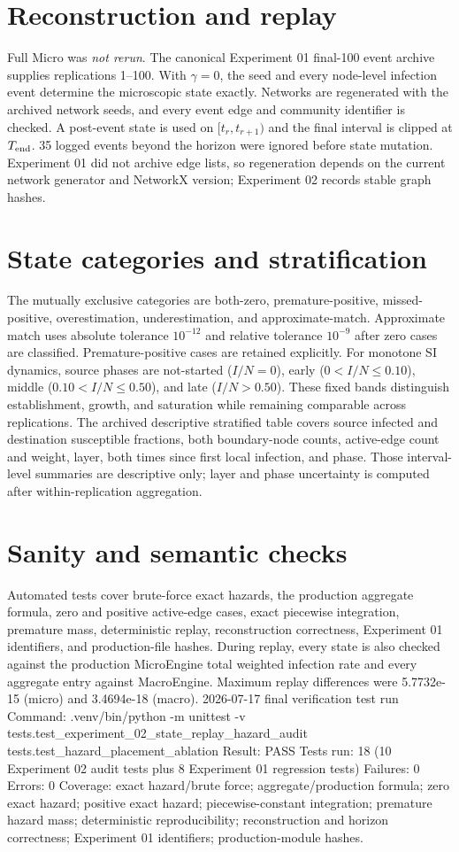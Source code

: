 \documentclass[11pt]{article}
\begin{document}
\section{Reconstruction and replay}
Full Micro was \emph{not rerun}. The canonical Experiment 01 final-100 event archive supplies replications 1--100. With $\gamma=0$, the seed and every node-level infection event determine the microscopic state exactly. Networks are regenerated with the archived network seeds, and every event edge and community identifier is checked. A post-event state is used on $[t_r,t_{r+1})$ and the final interval is clipped at $T_{\rm end}$. 35 logged events beyond the horizon were ignored before state mutation. Experiment 01 did not archive edge lists, so regeneration depends on the current network generator and NetworkX version; Experiment 02 records stable graph hashes.

\section{State categories and stratification}
The mutually exclusive categories are both-zero, premature-positive, missed-positive, overestimation, underestimation, and approximate-match. Approximate match uses absolute tolerance $10^{-12}$ and relative tolerance $10^{-9}$ after zero cases are classified. Premature-positive cases are retained explicitly. For monotone SI dynamics, source phases are not-started ($I/N=0$), early ($0<I/N\le0.10$), middle ($0.10<I/N\le0.50$), and late ($I/N>0.50$). These fixed bands distinguish establishment, growth, and saturation while remaining comparable across replications. The archived descriptive stratified table covers source infected and destination susceptible fractions, both boundary-node counts, active-edge count and weight, layer, both times since first local infection, and phase. Those interval-level summaries are descriptive only; layer and phase uncertainty is computed after within-replication aggregation.

\section{Sanity and semantic checks}
Automated tests cover brute-force exact hazards, the production aggregate formula, zero and positive active-edge cases, exact piecewise integration, premature mass, deterministic replay, reconstruction correctness, Experiment 01 identifiers, and production-file hashes. During replay, every state is also checked against the production MicroEngine total weighted infection rate and every aggregate entry against MacroEngine. Maximum replay differences were 5.7732e-15 (micro) and 3.4694e-18 (macro). 2026-07-17 final verification test run
Command: .venv/bin/python -m unittest -v tests.test\_experiment\_02\_state\_replay\_hazard\_audit tests.test\_hazard\_placement\_ablation
Result: PASS
Tests run: 18 (10 Experiment 02 audit tests plus 8 Experiment 01 regression tests)
Failures: 0
Errors: 0
Coverage: exact hazard/brute force; aggregate/production formula; zero exact hazard; positive exact hazard; piecewise-constant integration; premature hazard mass; deterministic reproducibility; reconstruction and horizon correctness; Experiment 01 identifiers; production-module hashes.
\end{document}
